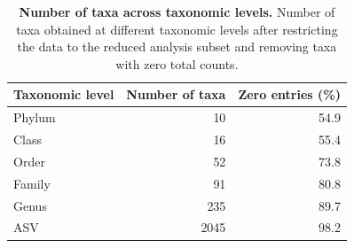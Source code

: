 \begin{table}

\caption{\label{tab:unnamed-chunk-4}\textbf{Number of taxa across taxonomic levels.} Number of taxa obtained at different taxonomic levels after restricting the data to the reduced analysis subset and removing taxa with zero total counts.}
\centering
\begin{tabular}[t]{lrr}
\toprule
Taxonomic level & Number of taxa & Zero entries (\%)\\
\midrule
Phylum & 10 & 54.9\\
Class & 16 & 55.4\\
Order & 52 & 73.8\\
Family & 91 & 80.8\\
Genus & 235 & 89.7\\
\addlinespace
ASV & 2045 & 98.2\\
\bottomrule
\end{tabular}
\end{table}
